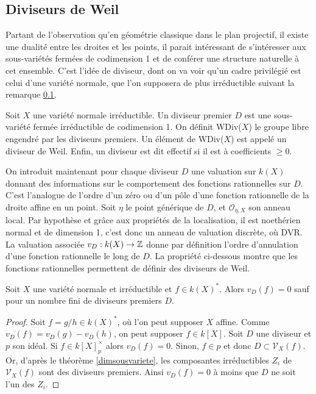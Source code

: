 \subsection{Diviseurs de Weil}

Partant de l'observation qu'en géométrie classique dans le plan projectif, il existe une dualité entre les droites et les points, il parait intéressant de s'intéresser aux sous-variétés fermées de codimension 1 et de conférer une structure naturelle à cet ensemble. C'est l'idée de diviseur, dont on va voir qu'un cadre privilégié est celui d'une variété normale, que l'on supposera de plus irréductible suivant la remarque \ref{}.

\begin{defn}
Soit $X$ une variété normale irréductible. Un diviseur premier $D$ est une sous-variété fermée irréductible de codimension 1. On définit WDiv($X$) le groupe libre engendré par les diviseurs premiers. Un élément de WDiv($X$) est appelé un diviseur de Weil. Enfin, un diviseur est dit effectif si il est à coefficients $\geq 0$. 
\end{defn}
On introduit maintenant pour chaque diviseur $D$ une valuation sur $k(X)$ donnant des informations sur le comportement des fonctions rationnelles sur $D$. C'est l'analogue de l'ordre d'un zéro ou d'un pôle d'une fonction rationnelle de la droite affine en un point. Soit $\eta$ le point générique de $D$, et $\mathcal{O}_{\eta,X}$ son anneau local. Par hypothèse et grâce aux propriétés de la localisation, il est noethérien normal et de dimension 1, c'est donc un anneau de valuation discrète, où DVR. La valuation associée $v_D:k(X)\rightarrow \mathbb{Z}$ donne par définition l'ordre d'annulation d'une fonction rationnelle le long de $D$. La propriété ci-dessous montre que les fonctions rationnelles permettent de définir des diviseurs de Weil.

\begin{prop}\label{noetherienPWDivBienDef}
Soit $X$ une variété normale et irréductible et $f\in k(X)^*$. Alors $v_D(f)=0$ sauf pour un nombre fini de diviseurs premiers $D$.
\end{prop}
\begin{proof}
Soit $f=g/h\in k(X)^*$, où l'on peut supposer $X$ affine. Comme $v_D(f)=v_D(g)-v_D(h)$, on peut supposer $f\in k[X]$. Soit $D$ une diviseur et $p$ son idéal. Si $f\in k[X]_p^\times$ alors $v_D(f)=0$. Sinon, $f\in p$ et donc $D \subset \mathcal{V}_X(f)$. Or, d'après le théorème \ref{dimsousvariete}, les composantes irréductibles $Z_i$ de $\mathcal{V}_X(f)$ sont des diviseurs premiers. Ainsi $v_D(f)=0$ à moins que $D$ ne soit l'un des $Z_i$.
\end{proof}

